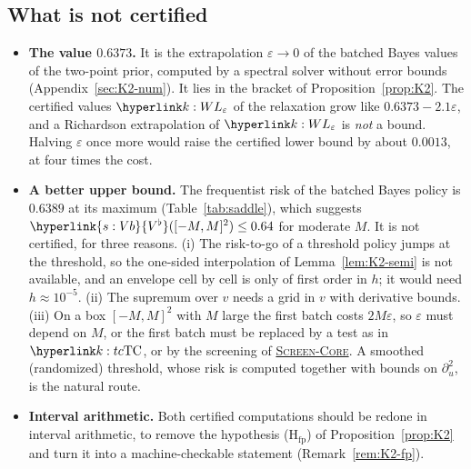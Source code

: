 \documentclass[11pt]{article}
\DeclareRobustCommand{\sy}[2]{{\hyperlink{#1}{#2}}}
\newcommand{\1}{\mathbf{1}}
\newcommand{\Vb}{\sy{s:Vb}{V^\flat}}
\newcommand{\SC}{\sy{alg:sc}{\textsc{Screen-Core}}}
\begin{document}
\subsection{What is not certified}\label{sec:K2-open}
\begin{itemize}
\item \textbf{The value $0.6373$.} It is the extrapolation $\varepsilon\to0$ of the batched Bayes values of the two-point prior, computed by a spectral solver without
error bounds (Appendix~\ref{sec:K2-num}). It lies in the bracket of Proposition~\ref{prop:K2}. The certified values $\kL$ of the relaxation grow like $0.6373-2.1\varepsilon$, and a
Richardson extrapolation of $\kL$ is \emph{not} a bound. Halving $\varepsilon$ once more would raise the certified lower bound by about $0.0013$, at four times the cost.
\item \textbf{A better upper bound.} The frequentist risk of the batched Bayes policy is $0.6389$ at its maximum (Table~\ref{tab:saddle}), which suggests
$\Vb([-M,M]^2)\le0.64$ for moderate $M$. It is not certified, for three reasons. (i) The risk-to-go of a threshold policy jumps at the threshold, so the one-sided
interpolation of Lemma~\ref{lem:K2-semi} is not available, and an envelope cell by cell is only of first order in $h$; it would need $h\approx10^{-5}$. (ii) The supremum over
$v$ needs a grid in $v$ with derivative bounds. (iii) On a box $[-M,M]^2$ with $M$ large the first batch costs $2M\varepsilon$, so $\varepsilon$ must depend on $M$, or the first
batch must be replaced by a test as in $\kTC$, or by the screening of \SC. A smoothed (randomized) threshold, whose risk is computed together with bounds on
$\partial_u^2$, is the natural route.
\item \textbf{Interval arithmetic.} Both certified computations should be redone in interval arithmetic, to remove the hypothesis (H$_{\mathrm{fp}}$) of
Proposition~\ref{prop:K2} and turn it into a machine-checkable statement (Remark~\ref{rem:K2-fp}).
\end{itemize}
\end{document}
